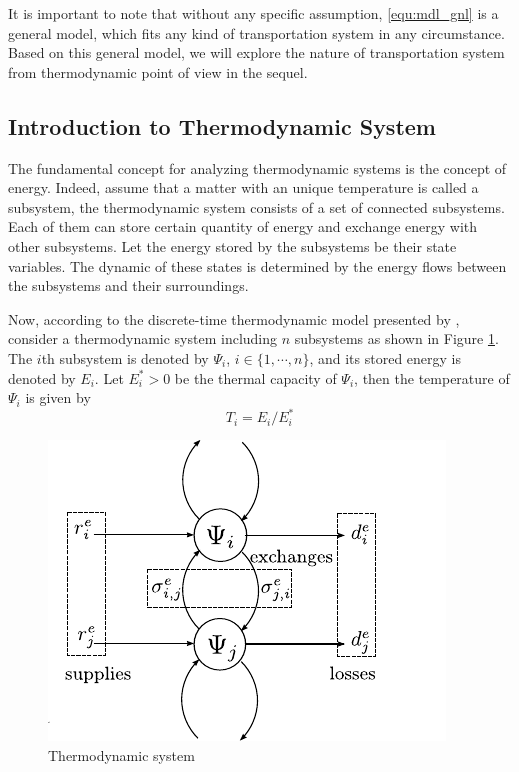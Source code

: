 \documentclass[preprint,authoryear,12pt]{elsarticle}
\begin{document}
It is important to note that without any specific assumption,
\eqref{equ:mdl_gnl} is a general model, which fits any kind of
transportation system in any circumstance. Based on this general
model, we will explore the nature of transportation system from
thermodynamic point of view in the sequel.

\subsection{Introduction to Thermodynamic System}

The fundamental concept for analyzing   thermodynamic
systems is the concept of energy. Indeed, assume that a matter with
an unique temperature is called a subsystem, the thermodynamic system
consists of a set of connected subsystems. Each of them can store
certain quantity of energy and exchange energy with other subsystems.
Let the energy stored by the subsystems be their state variables. The
dynamic of these states is determined by the energy flows between the
subsystems and their surroundings.

Now, according to the discrete-time thermodynamic model presented by
\citet{haddad_thermodynamic_2005}, consider a thermodynamic system
including $n$ subsystems as shown in Figure \ref{fig:Ther_Sys}. The
$i$th subsystem is denoted by $\Psi_i$, $i\in \{1,\cdots,n\}$, and
its stored energy is denoted by $E_i$. Let $E_i^*>0$ be the thermal
capacity of $\Psi_i$, then the temperature of $\Psi_i$ is given by
\begin{equation}\label{equ:temperature}
    T_i= {E_i}/{E^*_i}
\end{equation}

\begin{figure}[ht]
  \centering
  \includegraphics{pics/HModel}
  \caption{Thermodynamic system}
  \label{fig:Ther_Sys}
\end{figure}
\end{document}
